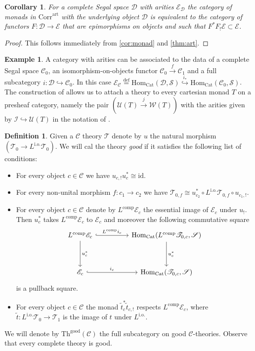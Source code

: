 \documentclass[a4paper, reqno]{amsart}
\newtheorem{cor}[theorem]{Corollary}
\theoremstyle{definition}
\newtheorem{defn}[theorem]{Definition}
\newtheorem{ex}[theorem]{Example}
\newcommand\cC{\mathscr C}
\newcommand\cD{\mathscr D}
\newcommand\cE{\mathscr E}
\newcommand\cI{\mathscr I}
\newcommand\cS{\mathscr S}
\newcommand\cT{\mathscr T}
\newcommand\cU{\mathscr U}
\newcommand\cW{\mathscr W}
\newcommand\good{\mathrm{good}}
\newcommand\art{\mathrm{art}}
\newcommand\id{\mathrm{id}}
\newcommand\mor{\mathrm{Hom}}
\newcommand\cat{\mathrm{Cat}}
\newcommand\comp{\mathrm{comp}}
\newcommand\thr{\mathrm{Th}}
\newcommand\bydef{\overset{\mathrm{def}}{=}}
\newcommand\corr{\mathrm{Corr}}
\newcommand\bo{\mathrm{i.o.}}
\begin{document}
\begin{cor}
For a complete Segal space $\cD$ with arities $\cE_\cD$ the category of monads in $\corr^\art$ with the underlying object $\cD$ is equivalent to the category of functors $F:\cD\rightarrow\cE$ that are epimorphisms on objects and such that $F^*F_!\cE\subset\cE$. 
\end{cor}
\begin{proof}
This follows immediately from \cref{cor:monad} and \cref{thm:art}.
\end{proof}
\begin{ex}\label{ex:preshv}
A category with arities can be associated to the data of a complete Segal space $\cC_0$, an isomorphism-on-objects functor $\cC_0\xrightarrow{f}\cC_1$ and a full subcategory $i:\cD\hookrightarrow\cC_0$. In this case $\cE_\cC\bydef\mor_\cat(\cD,\cS)\overset{i_*}{\hookrightarrow}\mor_\cat(\cC_0,\cS)$. The construction of \cite[Section 13]{chu2019homotopy} allows us to attach a theory to every cartesian monad $T$ on a presheaf category, namely the pair $(\cU(T)\xrightarrow{j}\cW(T))$ with the arities given by $\cI\hookrightarrow\cU(T)$ in the notation of \cite{chu2019homotopy}.
\end{ex}
\begin{defn}\label{def:good}
Given a $\cC$ theory $\cT$ denote by $u$ the natural morphism $(\cT_0\rightarrow L^\bo\cT_0)$. We will cal the theory \textit{good} if it satisfies the following list of conditions:
\begin{itemize}
    \item For every object $c\in\cC$ we have $u_{c,!}u^*_c\cong\id$.
    \item For every non-unital morphism $f:c_1\rightarrow c_2$ we have $\cT_{0,f}\cong u^*_{c_2}\circ L^\bo\cT_{0,f}\circ u_{c_1,!}$.
    \item For every object $c\in\cC$ denote by $L^\comp\cE_c$ the essential image of $\cE_c$ under $u_!$. Then $u_c^*$ takes $L^\comp\cE_c$ to $\cE_c$ and moreover the following commutative square
    \[
    \begin{tikzcd}[row sep=huge, column sep=huge]
    L^\comp\cE_c\arrow[r, hook,"L^\comp i_c"]\arrow[d, "u_c^*"]&\mor_\cat(L^\comp\cT_{0,c},\cS)\arrow[d, "u_c^*"]\\
    \cE_c\arrow[r, hook, "i_c"]&\mor_\cat(\cT_{0,c},\cS)
    \end{tikzcd}
    \]
    is a pullback square.
    \item For every object $c\in\cC$ the monad $\widetilde{t}^*_c\widetilde{t}_{c,!}$ respects $L^\comp\cE_c$, where $\widetilde{t}:L^\bo\cT_0\rightarrow\cT_1$ is the image of $t$ under $L^\bo$.
\end{itemize}
We will denote by $\thr^\good(\cC)$ the full subcategory on good $\cC$-theories. Observe that every complete theory is good.
\end{defn}
\end{document}
